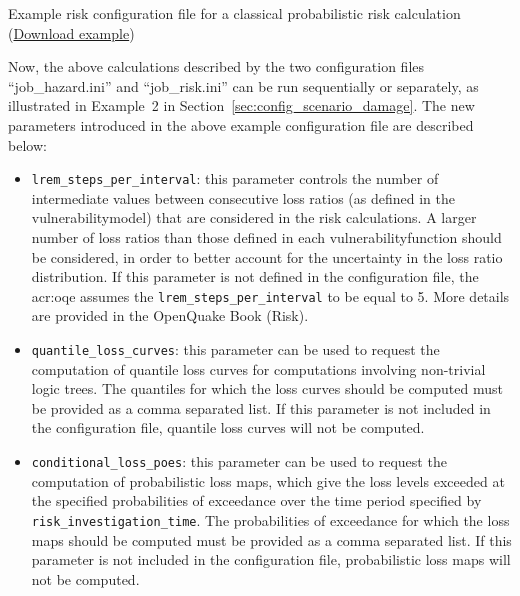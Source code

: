 \begin{listing}[htbp]
  \inputminted[firstline=1,firstnumber=1,fontsize=\footnotesize,frame=single,linenos,bgcolor=lightgray,label=job\_risk.ini]{ini}{oqum/risk/verbatim/config_classical_risk.ini}
  \caption{Example risk configuration file for a classical probabilistic risk calculation (\href{https://raw.githubusercontent.com/GEMScienceTools/oq-engine-docs/master/oqum/risk/verbatim/config_classical_risk.xml}{Download example})}
  \label{lst:config_classical_risk}
\end{listing}

Now, the above calculations described by the two configuration files
``job\_hazard.ini'' and ``job\_risk.ini'' can be run sequentially or
separately, as illustrated in Example~2 in
Section~\ref{sec:config_scenario_damage}. The new parameters introduced in the
above example configuration file are described below:

\begin{itemize}

	\item \Verb+lrem_steps_per_interval+: this parameter controls the number of
	  intermediate values between consecutive loss ratios (as defined in the 
	  \gls{vulnerabilitymodel}) that are considered in the risk calculations.
	  A larger number of loss ratios than those defined in each
	  \gls{vulnerabilityfunction} should be considered, in order to better
	  account for the uncertainty in the loss ratio distribution. If this
	  parameter is not defined in the configuration file, the \glsdesc{acr:oqe}
	  assumes the \Verb+lrem_steps_per_interval+ to be equal to 5. More details
	  are provided in the OpenQuake Book (Risk).

	\item \Verb+quantile_loss_curves+: this parameter can be used to request
	  the computation of quantile loss curves for computations involving
	  non-trivial logic trees. The quantiles for which the loss curves should
	  be computed must be provided as a comma separated list. If this parameter
	  is not included in the configuration file, quantile loss curves will not
	  be computed. 

	\item \Verb+conditional_loss_poes+: this parameter can be used to request
	  the computation of probabilistic loss maps, which give the loss levels
	  exceeded at the specified probabilities of exceedance over the time
	  period specified by \Verb+risk_investigation_time+. The probabilities of
	  exceedance for which the loss maps should be computed must be provided as
	  a comma separated list. If this parameter is not included in the
	  configuration file, probabilistic loss maps will not be computed.

\end{itemize}